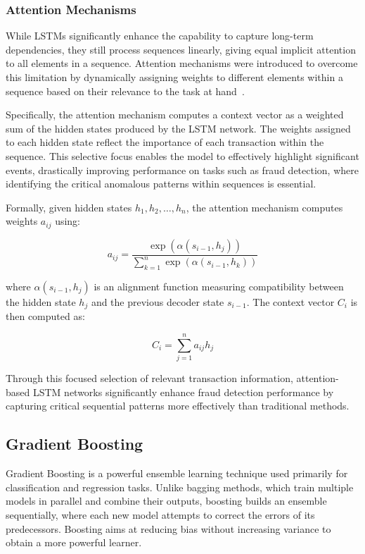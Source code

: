 \subsubsection{Attention Mechanisms}
While LSTMs significantly enhance the capability to capture long-term dependencies, they still process sequences linearly, giving equal implicit attention to all elements in a sequence. Attention mechanisms were introduced to overcome this limitation by dynamically assigning weights to different elements within a sequence based on their relevance to the task at hand~\cite{bahdanau2016neuralmachinetranslationjointly}.

Specifically, the attention mechanism computes a context vector as a weighted sum of the hidden states produced by the LSTM network. The weights assigned to each hidden state reflect the importance of each transaction within the sequence. This selective focus enables the model to effectively highlight significant events, drastically improving performance on tasks such as fraud detection, where identifying the critical anomalous patterns within sequences is essential.

Formally, given hidden states \(h_1, h_2, \dots, h_n\), the attention mechanism computes weights \(a_{ij}\) using:

\[
a_{ij} = \frac{\exp(\alpha(s_{i-1}, h_j))}{\sum_{k=1}^{n}\exp(\alpha(s_{i-1}, h_k))}
\]

where \(\alpha(s_{i-1}, h_j)\) is an alignment function measuring compatibility between the hidden state \(h_j\) and the previous decoder state \(s_{i-1}\). The context vector \(C_i\) is then computed as:

\[
C_i = \sum_{j=1}^{n} a_{ij}h_j
\]

Through this focused selection of relevant transaction information, attention-based LSTM networks significantly enhance fraud detection performance by capturing critical sequential patterns more effectively than traditional methods.

\subsection{Gradient Boosting}
Gradient Boosting\cite{4a848dd1-54e3-3c3c-83c3-04977ded2e71} is a powerful ensemble learning technique used primarily for classification and regression tasks.
Unlike bagging methods, which train multiple models in parallel and combine their outputs, boosting builds an ensemble sequentially, where each new model attempts to correct the errors of its predecessors. Boosting aims at reducing bias without increasing variance to obtain a more powerful learner. 

